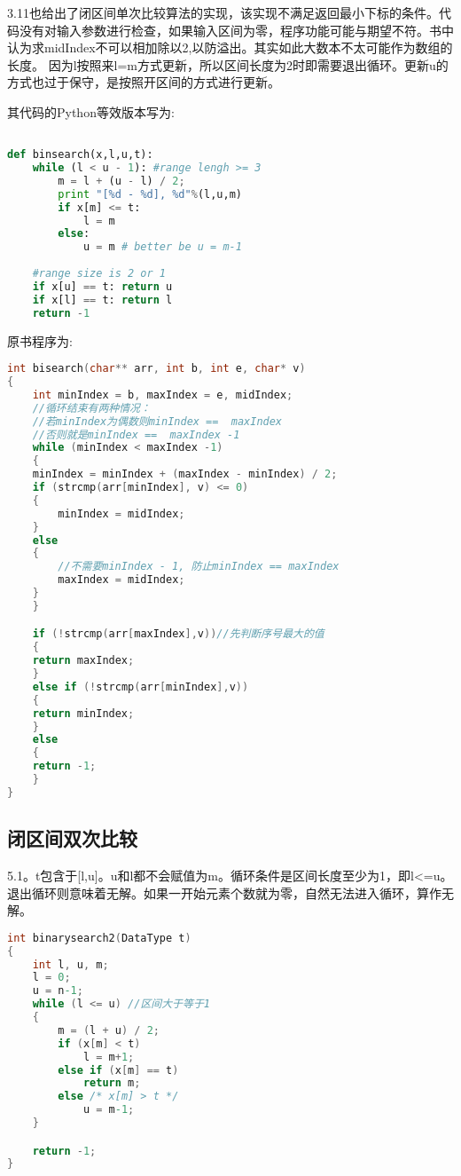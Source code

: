 \cite{bop}3.11也给出了闭区间单次比较算法的实现，该实现不满足返回最小下标的条件。代码没有对输入参数进行检查，如果输入区间为零，程序功能可能与期望不符。书中认为求midIndex不可以相加除以2,以防溢出。其实如此大数本不太可能作为数组的长度。
因为l按照来l=m方式更新，所以区间长度为2时即需要退出循环。更新u的方式也过于保守，是按照开区间的方式进行更新。

其代码的Python等效版本写为:
\begin{lstlisting}[language=Python]

def binsearch(x,l,u,t):
    while (l < u - 1): #range lengh >= 3 
        m = l + (u - l) / 2;
        print "[%d - %d], %d"%(l,u,m)
        if x[m] <= t:
            l = m
        else: 
            u = m # better be u = m-1
    
    #range size is 2 or 1 
    if x[u] == t: return u
    if x[l] == t: return l
    return -1

\end{lstlisting}

原书程序为:

\begin{lstlisting}[language=C]
int bisearch(char** arr, int b, int e, char* v)
{
    int minIndex = b, maxIndex = e, midIndex;
    //循环结束有两种情况：
    //若minIndex为偶数则minIndex ==  maxIndex
    //否则就是minIndex ==  maxIndex -1
    while (minIndex < maxIndex -1)
    {
	minIndex = minIndex + (maxIndex - minIndex) / 2;
	if (strcmp(arr[minIndex], v) <= 0)
	{
	    minIndex = midIndex;
	}
	else
	{
	    //不需要minIndex - 1, 防止minIndex == maxIndex
	    maxIndex = midIndex;
	}
    }

    if (!strcmp(arr[maxIndex],v))//先判断序号最大的值
    {
	return maxIndex;
    }
    else if (!strcmp(arr[minIndex],v))
    {
	return minIndex;
    }
    else
    {
	return -1;
    }
}
\end{lstlisting}


\subsection{闭区间双次比较}
\cite{pp}5.1。t包含于[l,u]。u和l都不会赋值为m。循环条件是区间长度至少为1，即l<=u。退出循环则意味着无解。如果一开始元素个数就为零，自然无法进入循环，算作无解。
\begin{lstlisting}[language=C]
int binarysearch2(DataType t)
{	
	int l, u, m;
	l = 0;
	u = n-1;
	while (l <= u) //区间大于等于1 
	{
		m = (l + u) / 2;
		if (x[m] < t)
			l = m+1;
		else if (x[m] == t)
			return m;
		else /* x[m] > t */
			u = m-1;
	}

	return -1;
}


\end{lstlisting}


